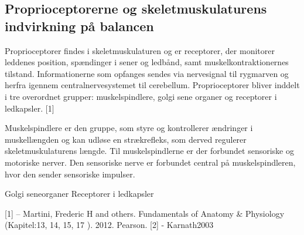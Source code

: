 
\subsection{Proprioceptorerne og skeletmuskulaturens indvirkning på balancen}
Proprioceptorer findes i skeletmuskulaturen og er receptorer, der monitorer leddenes position, spændinger i sener og ledbånd, samt muskelkontraktionernes tilstand. Informationerne som opfanges sendes via nervesignal til rygmarven og herfra igennem centralnervesystemet til cerebellum. Proprioceptorer bliver inddelt i tre overordnet grupper: muskelspindlere, golgi sene organer og receptorer i ledkapsler. [1]

Muskelspindlere er den gruppe, som styre og kontrollerer ændringer i muskellængden og kan udløse en strækrefleks, som derved regulerer skeletmuskulaturens længde. Til muskelspindlerne er der forbundet sensoriske og motoriske nerver. Den sensoriske nerve er forbundet central på muskelspindleren, hvor den sender sensoriske impulser.    

Golgi seneorganer 
Receptorer i ledkapsler




[1] – Martini, Frederic H and others. Fundamentals of Anatomy & Physiology (Kapitel:13, 14, 15, 17 ). 2012. Pearson. 
[2] - Karnath2003


